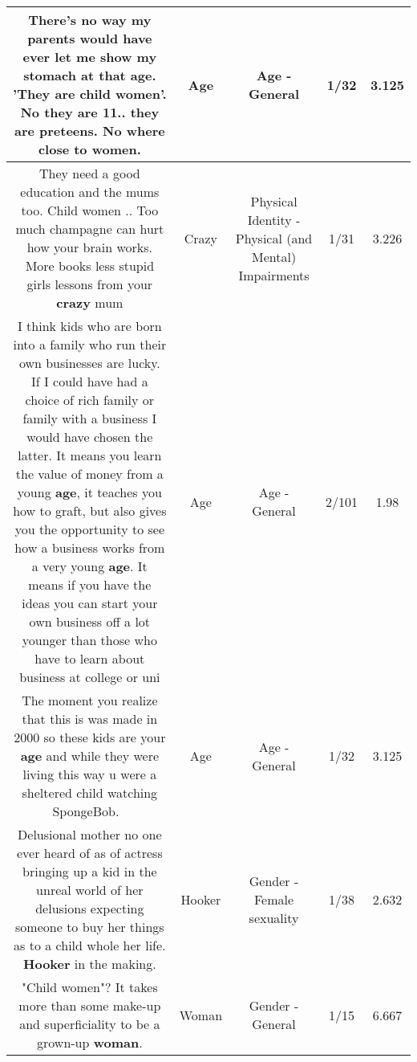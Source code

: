 \documentclass[11pt]{article}
\newlength\mylength
\begin{document}
\begin{center}
\begin{longtable}{|C{.65\mylength}|C{.30\mylength}|C{.12\mylength}|C{.12\mylength}|C{.12\mylength}|}
  \small There's no way my parents would have ever let me show my stomach at that \textbf{age}. 'They are child women'. No they are 11.. they are preteens. No where close to women.\normalsize   & Age & Age - General & 1/32 & 3.125 \\  \hline
  \small They need a good education and the mums too. Child women .. Too much champagne can hurt how your brain works. More books less stupid girls lessons from your \textbf{crazy} mum\normalsize   & Crazy & Physical Identity - Physical (and Mental) Impairments & 1/31 & 3.226 \\  \hline
  \small I think kids who are born into a family who run their own businesses are lucky. If I could have had a choice of rich family or family with a business I would have chosen the latter. It means you learn the value of money from a young \textbf{age}, it teaches you how to graft, but also gives you the opportunity to see how a business works from a very young \textbf{age}. It means if you have the ideas you can start your own business off a lot younger than those who have to learn about business at college or uni\normalsize   & Age & Age - General & 2/101 & 1.98 \\  \hline
  \small The moment you realize that this is was made in 2000 so these kids are your \textbf{age} and while they were living this way u were a sheltered child watching SpongeBob. 🤣\normalsize   & Age & Age - General & 1/32 & 3.125 \\  \hline
  \small Delusional mother no one ever heard of as of actress bringing up a kid in the unreal world of her delusions expecting someone to buy her things as to a child whole her life. \textbf{Hooker} in the making.\normalsize   & Hooker & Gender - Female sexuality & 1/38 & 2.632 \\  \hline
  \small "Child women"? It takes more than some make-up and superficiality to be a grown-up \textbf{woman}.\normalsize   & Woman & Gender - General & 1/15 & 6.667 \\  \hline

\end{longtable}
\end{center}
\end{document}
